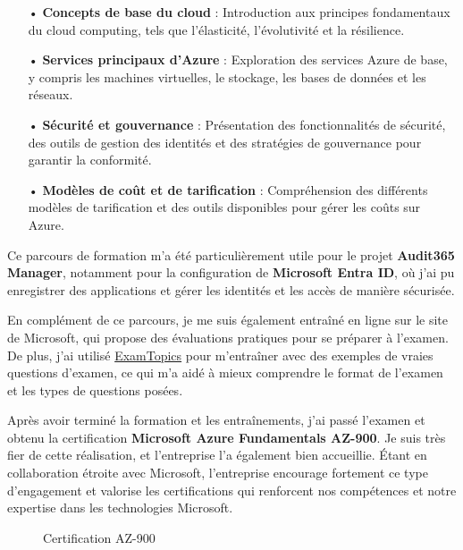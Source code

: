 \begin{itemize}
    \item[•] \textbf{Concepts de base du cloud} : Introduction aux principes fondamentaux du cloud computing, tels que l'élasticité, l'évolutivité et la résilience.
    \item[•] \textbf{Services principaux d'Azure} : Exploration des services Azure de base, y compris les machines virtuelles, le stockage, les bases de données et les réseaux.
    \item[•] \textbf{Sécurité et gouvernance} : Présentation des fonctionnalités de sécurité, des outils de gestion des identités et des stratégies de gouvernance pour garantir la conformité.
    \item[•] \textbf{Modèles de coût et de tarification} : Compréhension des différents modèles de tarification et des outils disponibles pour gérer les coûts sur Azure.
\end{itemize}

Ce parcours de formation m'a été particulièrement utile pour le projet \textbf{Audit365 Manager}, notamment pour la configuration de \textbf{Microsoft Entra ID}, où j'ai pu enregistrer des applications et gérer les identités et les accès de manière sécurisée.

En complément de ce parcours, je me suis également entraîné en ligne sur le site de Microsoft, qui propose des évaluations pratiques pour se préparer à l'examen. De plus, j'ai utilisé \href{https://www.examtopics.com/}{ExamTopics} pour m'entraîner avec des exemples de vraies questions d'examen, ce qui m'a aidé à mieux comprendre le format de l'examen et les types de questions posées.

Après avoir terminé la formation et les entraînements, j'ai passé l'examen et obtenu la certification \textbf{Microsoft Azure Fundamentals AZ-900}. Je suis très fier de cette réalisation, et l'entreprise l'a également bien accueillie. Étant en collaboration étroite avec Microsoft, l'entreprise encourage fortement ce type d'engagement et valorise les certifications qui renforcent nos compétences et notre expertise dans les technologies Microsoft.

\begin{figure}[H]
    \begin{center}
        \caption{Certification AZ-900}
    \end{center}
\end{figure}

